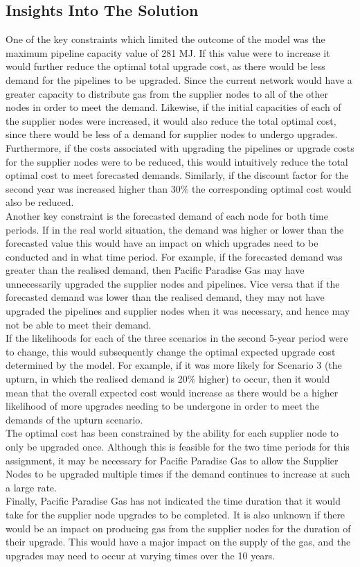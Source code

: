 \documentclass{article}
\begin{document}
\subsection{Insights Into The Solution}
\bigskip
One of the key constraints which limited the outcome of the model was the maximum pipeline capacity value of 281 MJ. If this value were to increase it would further reduce the optimal total upgrade cost, as there would be less demand for the pipelines to be upgraded. Since the current network would have a greater capacity to distribute gas from the supplier nodes to all of the other nodes in order to meet the demand. Likewise, if the initial capacities of each of the supplier nodes were increased, it would also reduce the total optimal cost, since there would be less of a demand for supplier nodes to undergo upgrades. 
\bigskip
\\
Furthermore, if the costs associated with upgrading the pipelines or upgrade costs for the supplier nodes were to be reduced, this would intuitively reduce the total optimal cost to meet forecasted demands. Similarly, if the discount factor for the second year was increased higher than 30\% the corresponding optimal cost would also be reduced.
\bigskip
\\
Another key constraint is the forecasted demand of each node for both time periods. If in the real world situation, the demand was higher or lower than the forecasted value this would have an impact on which upgrades need to be conducted and in what time period. For example, if the forecasted demand was greater than the realised demand, then Pacific Paradise Gas may have unnecessarily upgraded the supplier nodes and pipelines. Vice versa that if the forecasted demand was lower than the realised demand, they may not have upgraded the pipelines and supplier nodes when it was necessary, and hence may not be able to meet their demand. 
\bigskip
\\
If the likelihoods for each of the three scenarios in the second 5-year period were to change, this would subsequently change the optimal expected upgrade cost determined by the model. For example, if it was more likely for Scenario 3 (the upturn, in which the realised demand is 20\% higher) to occur, then it would mean that the overall expected cost would increase as there would be a higher likelihood of more upgrades needing to be undergone in order to meet the demands of the upturn scenario.
\bigskip
\\
The optimal cost has been constrained by the ability for each supplier node to only be upgraded once. Although this is feasible for the two time periods for this assignment, it may be necessary for Pacific Paradise Gas to allow the Supplier Nodes to be upgraded multiple times if the demand continues to increase at such a large rate. 
\bigskip
\\
Finally, Pacific Paradise Gas has not indicated the time duration that it would take for the supplier node upgrades to be completed. It is also unknown if there would be an impact on producing gas from the supplier nodes for the duration of their upgrade. This would have a major impact on the supply of the gas, and the upgrades may need to occur at varying times over the 10 years. 

\bigskip
\color{black}
\end{document}

